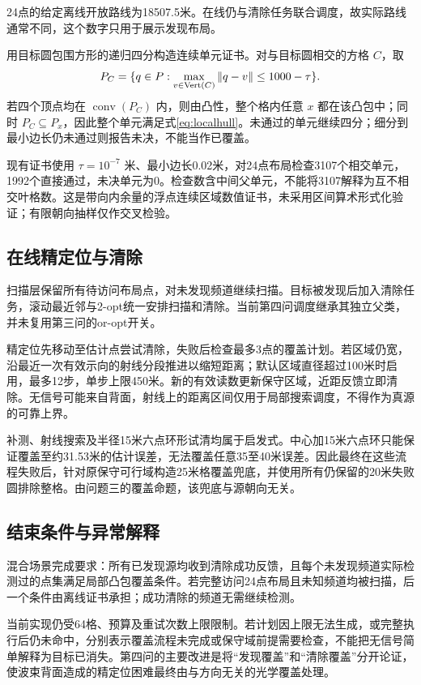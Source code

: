 24点的给定离线开放路线为18507.5米。在线仍与清除任务联合调度，故实际路线通常不同，这个数字只用于展示发现布局。

用目标圆包围方形的递归四分构造连续单元证书。对与目标圆相交的方格 $C$，取
\begin{equation}
P_C=\{q\in P:\max_{v\in\operatorname{Vert}(C)}\left\lVert q-v\right\rVert\le1000-\tau\}.
\end{equation}
若四个顶点均在 $\operatorname{conv}(P_C)$ 内，则由凸性，整个格内任意 $x$ 都在该凸包中；同时 $P_C\subseteq P_x$，因此整个单元满足式\eqref{eq:localhull}。未通过的单元继续四分；细分到最小边长仍未通过则报告未决，不能当作已覆盖。

现有证书使用 $\tau=10^{-7}$ 米、最小边长0.02米，对24点布局检查3107个相交单元，1992个直接通过，未决单元为0。检查数含中间父单元，不能将3107解释为互不相交叶格数。这是带向内余量的浮点连续区域数值证书，未采用区间算术形式化验证；有限朝向抽样仅作交叉检验。

\subsection{在线精定位与清除}
扫描层保留所有待访问布局点，对未发现频道继续扫描。目标被发现后加入清除任务，滚动最近邻与2-opt统一安排扫描和清除。当前第四问调度继承其独立父类，并未复用第三问的or-opt开关。

精定位先移动至估计点尝试清除，失败后检查最多3点的覆盖计划。若区域仍宽，沿最近一次有效示向的射线分段推进以缩短距离；默认区域直径超过100米时启用，最多12步，单步上限450米。新的有效读数更新保守区域，近距反馈立即清除。无信号可能来自背面，射线上的距离区间仅用于局部搜索调度，不得作为真源的可靠上界。

补测、射线搜索及半径15米六点环形试清均属于启发式。中心加15米六点环只能保证覆盖至约31.53米的估计误差，无法覆盖任意35至40米误差。因此最终在这些流程失败后，针对原保守可行域构造25米格覆盖兜底，并使用所有仍保留的20米失败圆排除整格。由问题三的覆盖命题，该兜底与源朝向无关。

\subsection{结束条件与异常解释}
混合场景完成要求：所有已发现源均收到清除成功反馈，且每个未发现频道实际检测过的点集满足局部凸包覆盖条件。若完整访问24点布局且未知频道均被扫描，后一个条件由离线证书承担；成功清除的频道无需继续检测。

当前实现仍受64格、预算及重试次数上限限制。若计划因上限无法生成，或完整执行后仍未命中，分别表示覆盖流程未完成或保守域前提需要检查，不能把无信号简单解释为目标已消失。第四问的主要改进是将“发现覆盖”和“清除覆盖”分开论证，使波束背面造成的精定位困难最终由与方向无关的光学覆盖处理。
